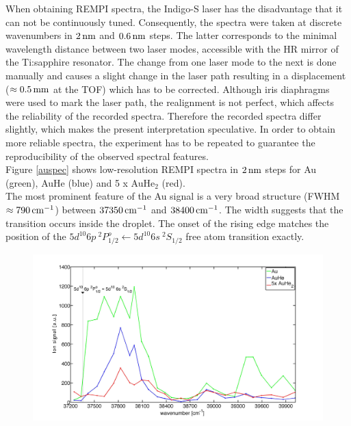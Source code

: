 \documentclass[parskip,12pt,headsepline,a4paper] {scrbook}
\begin{document}
When obtaining REMPI spectra, the Indigo-S laser has the disadvantage that it can not be continuously tuned. Consequently, the spectra were taken at discrete wavenumbers in $\unit[2]{nm}$ and $\unit[0.6]{nm}$ steps. The latter corresponds to the minimal wavelength distance between two laser modes, accessible with the HR mirror of the Ti:sapphire resonator. The change from one laser mode to the next is done manually and causes a slight change in the laser path resulting in a displacement ($\approx \unit[0.5]{mm}$ at the TOF) which has to be corrected. Although iris diaphragms were used to mark the laser path, the realignment is not perfect, which affects the reliability of the recorded spectra.
Therefore the recorded spectra differ slightly, which makes the present interpretation speculative. In order to obtain more reliable spectra, the experiment has to be repeated to guarantee the reproducibility of the observed spectral features. \\
Figure \ref{auspec} shows low-resolution REMPI spectra in $\unit[2]{nm}$ steps for Au (green), AuHe (blue) and 5 x AuHe$_2$ (red). \\
The most prominent feature of the Au signal is a very broad structure (FWHM $\approx \unit[790]{cm^{-1}}$) between $\unit[37350]{cm^{-1}}$ and $\unit[38400]{cm^{-1}}$. The width suggests that the transition occurs inside the droplet. The onset of the rising edge matches the position of the $5d^{10}6p \ ^2P^o_{1/2} \leftarrow 5d^{10}6s \ ^2S_{1/2}$ free atom transition exactly.
\begin{figure}[ht]
\centerline{
\includegraphics[width=17.5cm]{./results/au_spec_new.jpg}}
\end{figure}
\end{document}

